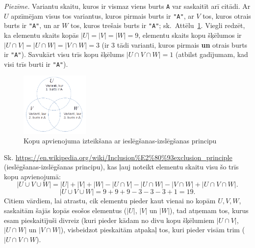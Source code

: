 \documentclass[11pt]{article}
\begin{document}


{\em Piezīme.} Variantu skaitu, kuros ir vismaz viens burts {\tt A} var saskaitīt arī citādi.
Ar $U$ apzīmējam visus tos variantus, kuros
pirmais burts ir {\tt "A"}, ar $V$ \textendash{} tos, kuros otrais burts ir {\tt "A"}, un ar
$W$ \textendash{} tos, kuros trešais burts ir {\tt "A"}; sk.\ Attēlu~\ref{fig:venn-diagram}. Viegli redzēt, ka elementu skaits
kopās $|U|=|V|=|W|=9$, elementu skaits kopu šķēlumos ir $|U \cap V| = |U \cap W| = |V \cap W| = 3$
(ir $3$ tādi varianti, kuros pirmais {\bf un} otrais burts ir {\tt "A"}). Savukārt visu
trīs kopu šķēlums $|U \cap V \cap W| = 1$ (atbilst gadījumam, kad visi trīs
burti ir {\tt "A"}).


\begin{figure}[h!]
\begin{center}
\includegraphics[width=0.3\textwidth]{fall2019-midterm/venn-diagram.png}
\caption{Kopu apvienojuma izteikšana ar ieslēgšanas-izslēgšanas principu\label{fig:venn-diagram}}
\end{center}
\end{figure}

Sk. \url{https://en.wikipedia.org/wiki/Inclusion%E2%80%93exclusion_principle} (ieslēgšanas-izslēgšanas principu),
kas ļauj noteikt elementu skaitu visu šo trīs kopu apvienojumā:
\[ \left| U \cup V \cup W \right| = \left| U \right| + \left| V \right| + \left| W \right| -
\left| U \cap V \right| - \left| U \cap W \right| - \left| V \cap W \right| + \left| U \cap V \cap W \right|. \]
\[ \left| U \cup V \cup W \right| = 9+9+9 - 3 - 3 - 3+1 = 19. \]
Citiem vārdiem, lai atrastu, cik elementu pieder kaut vienai no kopām $U,V,W$, saskaitām
šajās kopās esošos elementus ($|U|$, $|V|$ un $|W|$), tad atņemam tos, kurus esam pieskaitījuši
divreiz (kuri pieder kādam no divu kopu šķēlumiem
$|U \cap V|$, $|U \cap W|$ un $|V \cap W|$), visbeidzot pieskaitām atpakaļ
tos, kuri pieder visām trim ($|U \cap V \cap W$).
\end{document}
